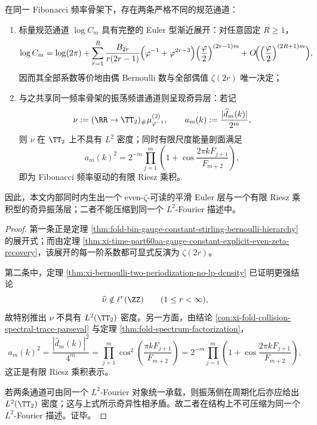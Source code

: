 \begin{theorem}\label{thm:conclusion-euler-riesz-two-phase-splitting}
在同一 Fibonacci 频率骨架下，存在两条严格不同的规范通道：
\begin{enumerate}
  \item 标量规范通道 \(\log C_m\) 具有完整的 Euler 型渐近展开：对任意固定 \(R\ge 1\)，
  \[
  \log C_m
  =
  \log(2\pi)
  +
  \sum_{r=1}^{R}
  \frac{B_{2r}}{r(2r-1)}
  \Bigl(\varphi^{-1}+\varphi^{2r-3}\Bigr)
  \Bigl(\frac{\varphi}{2}\Bigr)^{(2r-1)m}
  +
  O\!\Bigl(\Bigl(\frac{\varphi}{2}\Bigr)^{(2R+1)m}\Bigr),
  \]
  因而其全部系数等价地由偶 Bernoulli 数与全部偶值 \(\zeta(2r)\) 唯一决定；
  \item 与之共享同一频率骨架的振荡频谱通道则呈现奇异层：若记
  \[
  \nu:=(\RR\to\TT_2)_\#\mu_{\varphi^{-1}}^{(2)},
  \qquad
  a_m(k):=\frac{|\widehat d_m(k)|}{2^m},
  \]
  则 \(\nu\) 在 \(\TT_2\) 上不具有 \(L^2\) 密度；同时有限尺度能量剖面满足
  \[
  a_m(k)^2
  =
  2^{-m}\prod_{j=1}^{m}
  \left(
  1+\cos\frac{2\pi kF_{j+1}}{F_{m+2}}
  \right),
  \]
  即为 Fibonacci 频率驱动的有限 Riesz 乘积。
\end{enumerate}
因此，本文内部同时内生出一个 even-\(\zeta\)-可读的平滑 Euler 层与一个有限 Riesz 乘积型的奇异振荡层；二者不能压缩到同一个 \(L^2\)-Fourier 描述中。
\end{theorem}
\begin{proof}
第一条正是定理 \ref{thm:fold-bin-gauge-constant-stirling-bernoulli-hierarchy} 的展开式；而由定理 \ref{thm:xi-time-part60aa-gauge-constant-explicit-even-zeta-recovery}，该展开的每一阶系数都可显式反演为 \(\zeta(2r)\)。

第二条中，定理 \ref{thm:xi-bernoulli-two-periodization-no-lp-density} 已证明更强结论
\[
\widehat\nu\notin \ell^r(\ZZ)\qquad (1\le r<\infty),
\]
故特别推出 \(\nu\) 不具有 \(L^2(\TT_2)\) 密度。另一方面，由结论 \ref{con:xi-fold-collision-spectral-trace-parseval} 与定理 \ref{thm:fold-spectrum-factorization}，
\[
a_m(k)^2
=
\frac{|\widehat d_m(k)|^2}{4^m}
=
\prod_{j=1}^{m}\cos^2\!\left(\frac{\pi kF_{j+1}}{F_{m+2}}\right)
=
2^{-m}\prod_{j=1}^{m}
\left(
1+\cos\frac{2\pi kF_{j+1}}{F_{m+2}}
\right),
\]
这正是有限 Riesz 乘积表示。

若两条通道可由同一个 \(L^2\)-Fourier 对象统一承载，则振荡侧在周期化后亦应给出 \(L^2(\TT_2)\) 密度；这与上式所示奇异性相矛盾。故二者在结构上不可压缩为同一个 \(L^2\)-Fourier 描述。证毕。
\end{proof}

